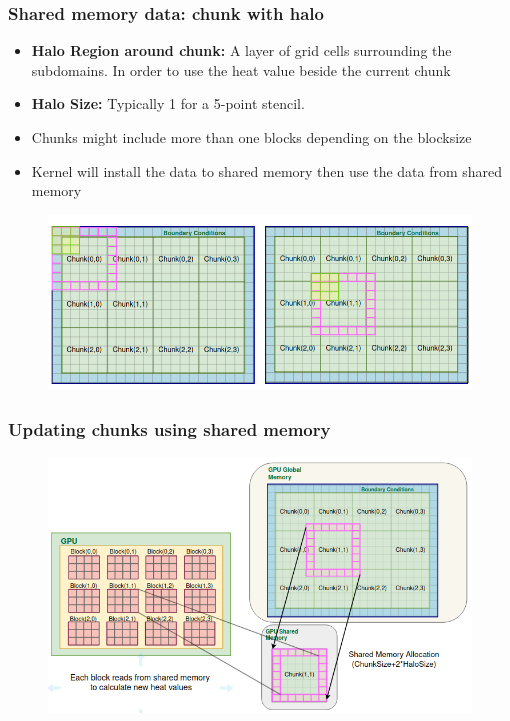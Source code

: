 \documentclass[9pt]{beamer}
\begin{document}
\begin{frame}
\frametitle{Shared memory data: chunk with halo}
\begin{itemize}
    \item \textbf{Halo Region around chunk:} A layer of grid cells surrounding the subdomains. In order to use the heat value beside the current chunk
    \item \textbf{Halo Size:} Typically 1 for a 5-point stencil.
    \item Chunks might include more than one blocks depending on the blocksize
    \item Kernel will install the data to shared memory then use the data from shared memory
\end{itemize}

\begin{figure}
    \centering
    \includegraphics[width=0.8\linewidth]{Screenshot from 2024-08-30 19-03-50.png}
    \label{fig:enter-label}
\end{figure}
\end{frame}

\begin{frame}
\frametitle{Updating chunks using shared memory}
\begin{figure}
    \centering
    \includegraphics[width=0.9\linewidth]{Screenshot from 2024-10-01 13-19-49.png}
    \label{fig:enter-label}
\end{figure}
\end{frame}
\end{document}

